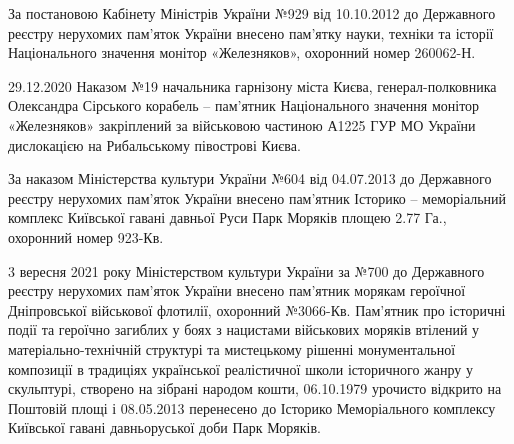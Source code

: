  
 
 
 
 
\zzSecCmt

\begin{itemize} %

За постановою Кабінету Міністрів України №929 від 10.10.2012 до Державного
реєстру нерухомих пам'яток України внесено пам'ятку науки, техніки та історії
Національного значення монітор «Железняков», охоронний номер 260062-Н.

29.12.2020 Наказом №19 начальника гарнізону міста Києва, генерал-полковника
Олександра Сірського корабель – пам'ятник Національного значення монітор
«Железняков» закріплений за військовою частиною А1225 ГУР МО України
дислокацією на Рибальському півострові Києва.

За наказом Міністерства культури України №604 від 04.07.2013 до Державного
реєстру нерухомих пам'яток України внесено пам'ятник Історико – меморіальний
комплекс Київської гавані давньої Руси Парк Моряків площею 2.77 Га., охоронний
номер 923-Кв.

3 вересня 2021 року Міністерством культури України за №700 до Державного
реєстру нерухомих пам'яток України внесено пам'ятник морякам героїчної
Дніпровської військової флотилії, охоронний №3066-Кв. Пам'ятник про історичні
події та героїчно загиблих у боях з нацистами військових моряків втілений у
матеріально-технічній структурі та мистецькому рішенні монументальної
композиції в традиціях української реалістичної школи історичного жанру у
скульптурі, створено на зібрані народом кошти, 06.10.1979 урочисто відкрито на
Поштовій площі і 08.05.2013 перенесено до Історико Меморіального комплексу
Київської гавані давньоруської доби Парк Моряків.

\end{itemize} %
